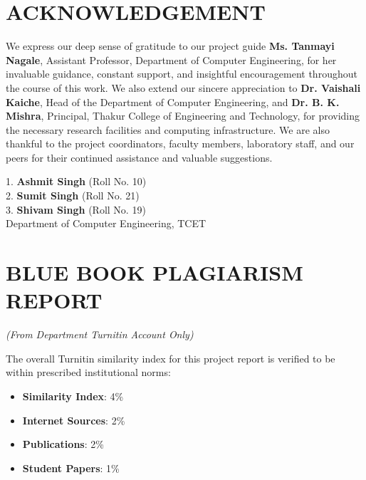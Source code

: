 \documentclass[12pt,a4paper,oneside]{report}
\begin{document}
\newpage

\chapter*{ACKNOWLEDGEMENT}
\thispagestyle{plain}
\noindent We express our deep sense of gratitude to our project guide \textbf{Ms. Tanmayi Nagale}, Assistant Professor, Department of Computer Engineering, for her invaluable guidance, constant support, and insightful encouragement throughout the course of this work. We also extend our sincere appreciation to \textbf{Dr. Vaishali Kaiche}, Head of the Department of Computer Engineering, and \textbf{Dr. B. K. Mishra}, Principal, Thakur College of Engineering and Technology, for providing the necessary research facilities and computing infrastructure. We are also thankful to the project coordinators, faculty members, laboratory staff, and our peers for their continued assistance and valuable suggestions.

\vspace{2.5cm}
\noindent
\begin{flushright}
1. \textbf{Ashmit Singh} (Roll No. 10)\\[0.2cm]
2. \textbf{Sumit Singh} (Roll No. 21)\\[0.2cm]
3. \textbf{Shivam Singh} (Roll No. 19)\\[0.4cm]
Department of Computer Engineering, TCET
\end{flushright}

\newpage

\chapter*{BLUE BOOK PLAGIARISM REPORT}
\thispagestyle{plain}
\begin{center}
\textit{(From Department Turnitin Account Only)}
\end{center}
\vspace{1.5cm}
\noindent The overall Turnitin similarity index for this project report is verified to be within prescribed institutional norms:
\begin{itemize}[leftmargin=1.5in]
    \item \textbf{Similarity Index}: 4\%
    \item \textbf{Internet Sources}: 2\%
    \item \textbf{Publications}: 2\%
    \item \textbf{Student Papers}: 1\%
\end{itemize}
\end{document}
